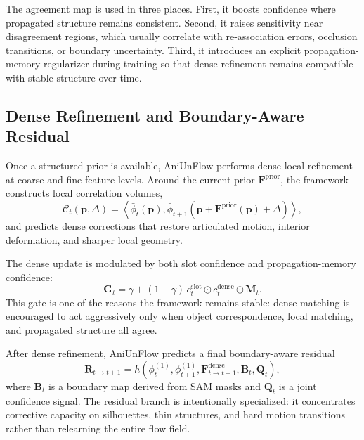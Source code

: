 The agreement map is used in three places. First, it boosts confidence where propagated structure remains consistent. Second, it raises sensitivity near disagreement regions, which usually correlate with re-association errors, occlusion transitions, or boundary uncertainty. Third, it introduces an explicit propagation-memory regularizer during training so that dense refinement remains compatible with stable structure over time.

\subsection{Dense Refinement and Boundary-Aware Residual}

Once a structured prior is available, AniUnFlow performs dense local refinement at coarse and fine feature levels. Around the current prior $\mathbf{F}^{\mathrm{prior}}$, the framework constructs local correlation volumes,
\begin{equation}
\mathcal{C}_t(\mathbf{p},\Delta) =
\left\langle
\bar{\phi}_{t}(\mathbf{p}),
\bar{\phi}_{t+1}\left(\mathbf{p} + \mathbf{F}^{\mathrm{prior}}(\mathbf{p}) + \Delta\right)
\right\rangle,
\end{equation}
and predicts dense corrections that restore articulated motion, interior deformation, and sharper local geometry.

The dense update is modulated by both slot confidence and propagation-memory confidence:
\begin{equation}
\mathbf{G}_t = \gamma + (1-\gamma)\,c^{\mathrm{slot}}_t \odot c^{\mathrm{dense}}_t \odot \mathbf{M}_t.
\end{equation}
This gate is one of the reasons the framework remains stable: dense matching is encouraged to act aggressively only when object correspondence, local matching, and propagated structure all agree.

After dense refinement, AniUnFlow predicts a final boundary-aware residual
\begin{equation}
\mathbf{R}_{t\rightarrow t+1} =
h\!\left(\phi_t^{(1)}, \phi_{t+1}^{(1)}, \mathbf{F}^{\mathrm{dense}}_{t\rightarrow t+1}, \mathbf{B}_t, \mathbf{Q}_t\right),
\end{equation}
where $\mathbf{B}_t$ is a boundary map derived from SAM masks and $\mathbf{Q}_t$ is a joint confidence signal. The residual branch is intentionally specialized: it concentrates corrective capacity on silhouettes, thin structures, and hard motion transitions rather than relearning the entire flow field.

